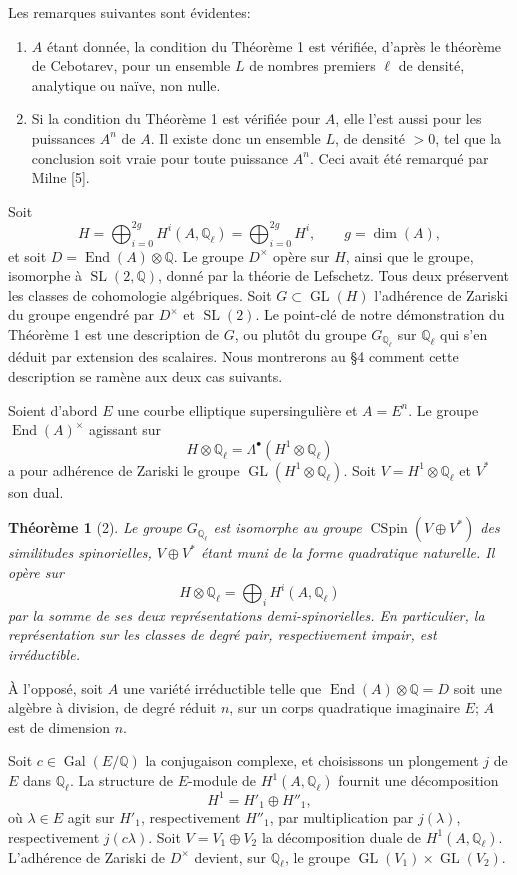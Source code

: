 \documentclass[11pt]{article}
\newcommand{\Q}{\mathbb Q}
\newcommand{\Gal}{\operatorname{Gal}}
\newcommand{\End}{\operatorname{End}}
\newcommand{\GL}{\operatorname{GL}}
\newcommand{\SL}{\operatorname{SL}}
\newcommand{\CSpin}{\operatorname{CSpin}}
\theoremstyle{deligne}
\newtheorem*{theorem*}{Théorème}
\begin{document}
Les remarques suivantes sont évidentes:
\begin{enumerate}[label=(\alph*)]
\item $A$ étant donnée, la condition du Théorème 1 est vérifiée, d'après le théorème de Cebotarev, pour un ensemble $L$ de nombres premiers $\ell$ de densité, analytique ou naïve, non nulle.
\item Si la condition du Théorème 1 est vérifiée pour $A$, elle l'est aussi pour les puissances $A^n$ de $A$. Il existe donc un ensemble $L$, de densité $>0$, tel que la conclusion soit vraie pour toute puissance $A^n$. Ceci avait été remarqué par Milne [5].
\end{enumerate}

Soit
\[
H=\bigoplus_{i=0}^{2g}H^i(A,\Q_\ell)=\bigoplus_{i=0}^{2g}H^i,
\qquad g=\dim(A),
\]
et soit $D=\End(A)\otimes\Q$. Le groupe $D^\times$ opère sur $H$, ainsi que le groupe, isomorphe à $\SL(2,\Q)$, donné par la théorie de Lefschetz. Tous deux préservent les classes de cohomologie algébriques. Soit $G\subset\GL(H)$ l'adhérence de Zariski du groupe engendré par $D^\times$ et $\SL(2)$. Le point-clé de notre démonstration du Théorème 1 est une description de $G$, ou plutôt du groupe $G_{\Q_\ell}$ sur $\Q_\ell$ qui s'en déduit par extension des scalaires. Nous montrerons au \S4 comment cette description se ramène aux deux cas suivants.

Soient d'abord $E$ une courbe elliptique supersingulière et $A=E^n$. Le groupe $\End(A)^\times$ agissant sur
\[
H\otimes\Q_\ell=\Lambda^\bullet(H^1\otimes\Q_\ell)
\]
a pour adhérence de Zariski le groupe $\GL(H^1\otimes\Q_\ell)$. Soit $V=H^1\otimes\Q_\ell$ et $V^*$ son dual.

\begin{theorem*}[2]
Le groupe $G_{\Q_\ell}$ est isomorphe au groupe $\CSpin(V\oplus V^*)$ des similitudes spinorielles, $V\oplus V^*$ étant muni de la forme quadratique naturelle. Il opère sur
\[
H\otimes\Q_\ell=\bigoplus_i H^i(A,\Q_\ell)
\]
par la somme de ses deux représentations demi-spinorielles. En particulier, la représentation sur les classes de degré pair, respectivement impair, est irréductible.
\end{theorem*}

À l'opposé, soit $A$ une variété irréductible telle que $\End(A)\otimes\Q=D$ soit une algèbre à division, de degré réduit $n$, sur un corps quadratique imaginaire $E$; $A$ est de dimension $n$.

Soit $c\in\Gal(E/\Q)$ la conjugaison complexe, et choisissons un plongement $j$ de $E$ dans $\Q_\ell$. La structure de $E$-module de $H^1(A,\Q_\ell)$ fournit une décomposition
\[
H^1=H'_1\oplus H''_1,
\]
où $\lambda\in E$ agit sur $H'_1$, respectivement $H''_1$, par multiplication par $j(\lambda)$, respectivement $j(c\lambda)$. Soit $V=V_1\oplus V_2$ la décomposition duale de $H^1(A,\Q_\ell)$. L'adhérence de Zariski de $D^\times$ devient, sur $\Q_\ell$, le groupe $\GL(V_1)\times\GL(V_2)$.
\end{document}
